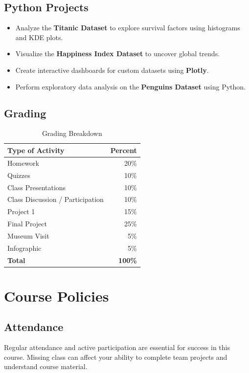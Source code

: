 \documentclass{exam}
\begin{document}
\subsection*{Python Projects}
\begin{itemize}
    \item Analyze the \textbf{Titanic Dataset} to explore survival factors using histograms and KDE plots.
    \item Visualize the \textbf{Happiness Index Dataset} to uncover global trends.
    \item Create interactive dashboards for custom datasets using \textbf{Plotly}.
    \item Perform exploratory data analysis on the \textbf{Penguins Dataset} using Python.
\end{itemize}

\subsection*{Grading}
\begin{table}[h]
    \centering
    \renewcommand{\arraystretch}{1.2}
    \begin{tabular}{|l|r|}
    \hline
    \textbf{Type of Activity} & \textbf{Percent} \\
    \hline
    Homework & 20\% \\
    \hline
    Quizzes & 10\% \\
    \hline
    Class Presentations & 10\% \\
    \hline
    Class Discussion / Participation & 10\% \\
    \hline
    Project 1 & 15\% \\
    \hline
    Final Project & 25\% \\
    \hline
    Museum Visit & 5\% \\
    \hline
    Infographic & 5\% \\
    \hline
    \textbf{Total} & \textbf{100\%} \\
    \hline
    \end{tabular}
    \caption{Grading Breakdown}
\end{table}

\section*{Course Policies}

\subsection*{Attendance}
Regular attendance and active participation are essential for success in this course. Missing class can affect your ability to complete team projects and understand course material.
\end{document}
